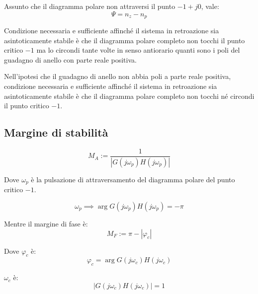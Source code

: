 Assunto che il diagramma polare non attraversi il punto $-1+j0$, vale:
\begin{equation}
  \Psi = n_z - n_p
\end{equation}


\begin{definition}
  Condizione necessaria e sufficiente affinché il sistema in retroazione sia
  asintoticamente stabile è che il diagramma polare completo non tocchi il
  punto critico $-1$ ma lo circondi tante volte in senso antiorario quanti sono
  i poli del guadagno di anello con parte reale positiva. 
\end{definition}


\begin{definition} Nell’ipotesi che il guadagno di anello
  non abbia poli a parte reale positiva, condizione necessaria e sufficiente
  affinché il sistema in retroazione sia asintoticamente stabile è che il
  diagramma polare completo non tocchi né circondi il punto critico $-1$.
\end{definition}


\subsection{Margine di stabilità}

\begin{equation}
  M_A := \frac{1}{|G(j\omega_p)H(j\omega_p)|}
  \label{eq:margine_stabilita}
\end{equation}

Dove $\omega_p$ è la pulsazione di attraversamento del diagramma polare del
punto critico $-1$.

\begin{equation}
  \omega_p \implies \arg G(j\omega_p)H(j\omega_p) = - \pi
\end{equation}

Mentre il margine di fase è:
\begin{equation}
  M_F := \pi - |\varphi_c|
  \label{eq:margine_fase}
\end{equation}

Dove $\varphi_c$ è:
\begin{equation}
\varphi_c = \arg G(j\omega_c)H(j\omega_c)
\end{equation}

$\omega_c$ è:
\begin{equation}
  |G(j\omega_c)H(j\omega_c)| = 1
\end{equation}



